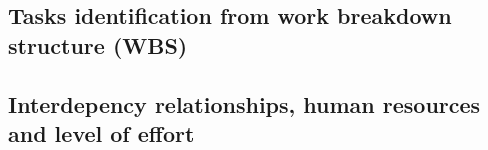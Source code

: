\subsection{Tasks identification from work breakdown structure (WBS)}


\pagebreak

\subsection{Interdepency relationships, human resources and level of effort}
\begin{longtable}{ | p{1.3cm} | p{5cm} | p{3cm} | p{3.5cm} |}
\hline


\end{longtable}
